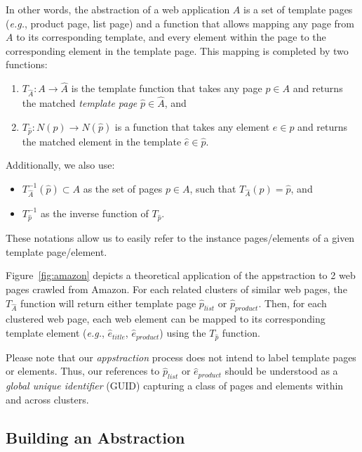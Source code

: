 In other words, the abstraction of a web application $A$ is a set of template pages (\emph{e.g.}, product page, list page) and a function that allows mapping any page from $A$ to its corresponding template, and every element within the page to the corresponding element in the template page.
This mapping is completed by two functions:
\begin{enumerate}
\item $T_{\hat{A}}: A \to \hat{A}$ is the template function that takes any page $p \in A$ and returns the matched \emph{template page} $\hat{p} \in \hat{A}$, and
\item $T_{\hat{p}}: N(p) \to N(\hat{p})$ is a function that takes any element $e \in p$ and returns the matched element in the template $\hat{e} \in \hat{p}$.
\end{enumerate}

Additionally, we also use:
\begin{itemize}
  \item $T^{-1}_{\hat{A}}(\hat{p}) \subset A$ as the set of pages $p \in A$, such that $T_{\hat{A}}(p) = \hat{p}$, and 
  \item $T^{-1}_{\hat{p}}$ as the inverse function of $T_{\hat{p}}$.
\end{itemize}
These notations allow us to easily refer to the instance pages/elements of a given template page/element.

Figure~\ref{fig:amazon} depicts a theoretical application of the appstraction to 2 web pages crawled from Amazon.
For each related clusters of similar web pages, the $T_{\hat{A}}$ function will return either template page $\hat{p}_{list}$ or $\hat{p}_{product}$.
Then, for each clustered web page, each web element can be mapped to its corresponding template element (\emph{e.g.}, $\hat{e}_{title}$, $\hat{e}_{product}$) using the $T_{\hat{p}}$ function.

Please note that our \emph{appstraction} process does not intend to label template pages or elements.
Thus, our references to $\hat{p}_{list}$ or $\hat{e}_{product}$ should be understood as a \emph{global unique identifier} (GUID) capturing a class of pages and elements within and across clusters.

\subsection{Building an Abstraction}

